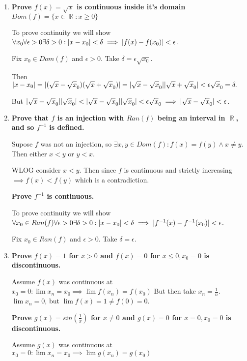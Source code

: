 \documentclass[10pt,a4paper]{article}
\DeclareMathOperator*{\R}{\mathbb{R}}
\DeclarePairedDelimiter{\abs}{\lvert}{\rvert}
\begin{document}
\begin{enumerate}
    \item \textbf{ Prove $f(x) = \sqrt x$ is continuous inside it's domain $Dom(f) = \{ x \in \R : x \geq 0 \}$}

        To prove continuity we will show $\forall x_0 \forall \epsilon > 0 \exists \delta > 0 : \abs{x - x_0} < \delta \implies \abs{f(x) - f(x_0)} < \epsilon$.

        Fix $x_0 \in Dom(f)$ and $\epsilon > 0 $. Take $\delta = \epsilon \sqrt{x_0}$.

        Then $\abs{x - x_0} = \abs{(\sqrt x - \sqrt x_0)(\sqrt x + \sqrt x_0)}  = \abs{\sqrt x - \sqrt x_0} \abs{\sqrt x + \sqrt x_0}   < \epsilon \sqrt x_0 = \delta.$
        
        But $\abs{\sqrt x - \sqrt x_0} \abs{\sqrt x_0} < \abs{\sqrt x - \sqrt x_0} \abs{\sqrt x_0}  < \epsilon \sqrt x_0 \implies \abs{\sqrt x - \sqrt x_0} < \epsilon$.

    \item \textbf{ Prove that $f$ is an injection with $Ran(f)$ being an interval in $\R$, and so $f^{-1}$ is defined.}

        Supose $f$ was not an injection, so $\exists x, y \in Dom(f): f(x) = f(y) \land x \neq y$. Then either $x < y$ or $y < x$.
        
        WLOG consider $x < y$. Then since $f$ is continuous and strictly increasing $\implies f(x) < f(y)$ which is a contradiction.  

        \textbf{ Prove $f^{-1}$ is continuous.}

        To prove continuity we will show $\forall x_0 \in Ran(f) \forall \epsilon > 0 \exists \delta > 0 : \abs{x - x_0} < \delta \implies \abs{f^{-1}(x) - f^{-1}(x_0)} < \epsilon$.

        Fix $x_0 \in Ran(f)$ and $\epsilon > 0 $. Take $\delta = \epsilon $.


    \item \textbf{Prove $f(x) = 1$ for $x > 0$ and $f(x) = 0$ for $x \leq 0 , x_0 = 0$ is discontinuous.} 

        Assume $f(x)$ was continuous at $x_0 = 0: \lim x_n = x_0 \implies  \lim f(x_n) = f(x_0)$ 
        But then take $x_n = \frac{1}{n}$.  $\lim x_n = 0$, but $\lim f(x) = 1 \neq f(0) = 0$. 

        \textbf{Prove $g(x) = sin (\frac{1}{x})$ for $x \neq 0$ and $g(x) = 0$ for $x = 0 , x_0 = 0$ is discontinuous.} 

        Assume $g(x)$ was continuous at $x_0 = 0: \lim x_n = x_0 \implies  \lim g(x_n) = g(x_0)$ 


\end{enumerate}
\end{document}
